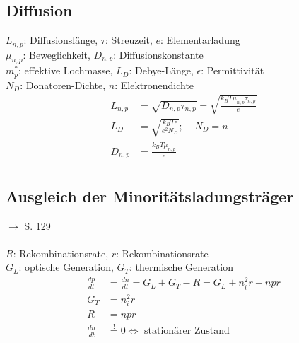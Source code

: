 \documentclass[a4paper,twocolumn,10pt]{article}
\newcommand{\sollsein}{\stackrel{!}{=}}
\begin{document}
\subsection{Diffusion}
$L_{n,p}$: Diffusionslänge, $\tau$: Streuzeit, $e$: Elementarladung\\
$\mu_{n,p}$: Beweglichkeit, $D_{n,p}$: Diffusionskonstante\\
$m_p^*$: effektive Lochmasse, $L_D$: Debye-Länge, $\epsilon$: Permittivität\\
$N_D$: Donatoren-Dichte, $n$: Elektronendichte
\begin{equation*}
\begin{split}
L_{n,p}&=\sqrt{D_{n,p}\tau_{n,p}}=\sqrt{\frac{k_BT\mu_{n,p}\tau_{n,p}}{e}}\\
L_D&=\sqrt{\frac{k_BT\epsilon}{e^2N_D}};\;\;\;\;N_D=n\\
D_{n,p}&=\frac{k_BT\mu_{n,p}}{e}\\
\end{split}
\end{equation*}

\subsection{Ausgleich der Minoritätsladungsträger}
$\rightarrow$ S. 129\\\\
$R$: Rekombinationsrate, $r$: Rekombinationsrate\\
$G_L$: optische Generation, $G_T$: thermische Generation
\begin{equation*}
\begin{split}
\frac{dp}{dt}&=\frac{dn}{dt}=G_L+G_T-R=G_L+n_i^2r-npr\\
G_T&=n_i^2r\\
R&=npr\\
\frac{dn}{dt}&\sollsein 0 \Leftrightarrow\text{ stationärer Zustand}
\end{split}
\end{equation*}
\end{document}
